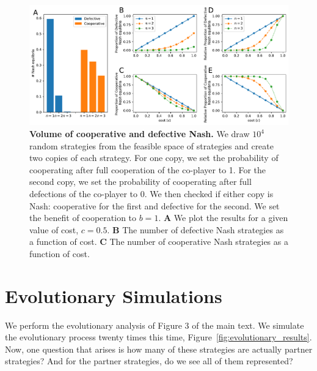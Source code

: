 \documentclass[11pt]{article}
\theoremstyle{plainCl1}
\theoremstyle{plainCl2}
\begin{document}
\begin{figure}[t]
  \centering
  \includegraphics[width=\textwidth]{../../figures/siFig1.pdf}
  \caption{
  \textbf{Volume of cooperative and defective Nash.}
We draw \(10^4\) random
strategies from the feasible space of strategies and create two copies of each
strategy. For one copy, we set the probability of cooperating after full
cooperation of the co-player to 1. For the second copy, we set the probability
of cooperating after full defections of the co-player to 0. We then checked if
either copy is Nash: cooperative for the first and defective for the second. We
set the benefit of cooperation to \(b = 1\). 
{\bf A} We plot the results for a given value of cost, \(c = 0.5\).
{\bf B} The number of defective Nash strategies as a function of cost.
{\bf C} The number of cooperative Nash strategies as a function of cost.
}\label{fig:reactive_volume}
\end{figure}



\section{Evolutionary Simulations}

We perform the evolutionary analysis of Figure 3 of the main text. We simulate
the evolutionary process twenty times this time,
Figure~\ref{fig:evolutionary_results}. Now, one question that arises is how many
of these strategies are actually partner strategies? And for the partner
strategies, do we see all of them represented? \\
\end{document}
